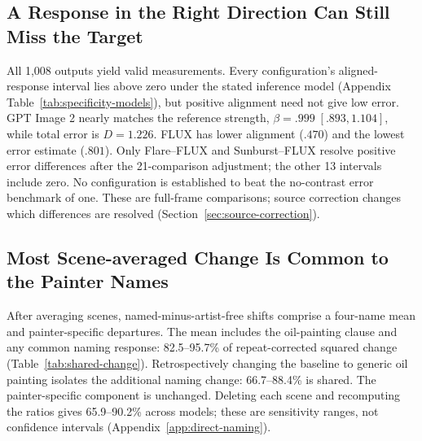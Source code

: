 \subsection{A Response in the Right Direction Can Still Miss the Target}
All 1,008 outputs yield valid measurements. Every configuration's aligned-response
interval lies above zero under the stated inference model (Appendix
Table~\ref{tab:specificity-models}), but positive alignment need not give low error.
GPT Image 2 nearly matches the reference strength,
$\beta=.999\;[.893,1.104]$, while total error is $D=1.226$.
FLUX has lower alignment ($.470$) and the lowest error estimate ($.801$).
Only Flare--FLUX and Sunburst--FLUX resolve positive error differences after
the 21-comparison adjustment; the other 13 intervals include zero.
No configuration is established to beat the no-contrast error benchmark of one.
These are full-frame comparisons; source correction changes which differences
are resolved (Section~\ref{sec:source-correction}).

\subsection{Most Scene-averaged Change Is Common to the Painter Names}\label{sec:shared-change}
After averaging scenes, named-minus-artist-free shifts comprise a four-name mean
and painter-specific departures. The mean includes the oil-painting clause and
any common naming response: 82.5--95.7\% of repeat-corrected squared change
(Table~\ref{tab:shared-change}). Retrospectively changing the baseline to generic
oil painting isolates the additional naming change: 66.7--88.4\% is shared.
The painter-specific component is unchanged. Deleting each scene and recomputing
the ratios gives 65.9--90.2\% across models; these are sensitivity ranges,
not confidence intervals (Appendix~\ref{app:direct-naming}).

